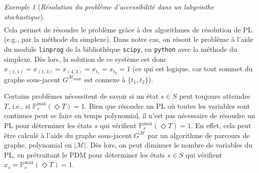 \documentclass[12pt,a4paper]{report}
\theoremstyle{definition}%
\theoremstyle{remark}
\newtheorem{example}{Exemple}[chapter]
\newcommand{\pr}{\mathbb{P}}
\begin{document}
\begin{example}[\textit{Résolution du problème d'accessibilité dans un labyrinthe stochastique}]
\begin{gather*}
\end{gather*}
Cela permet de résoudre le problème grâce à des algorithmes de résolution de
PL (e.g., par la méthode du simplexe).
Dans notre cas, on résout le problème à l'aide du module \verb|linprog|
de la bibliothèque \verb|scipy|, en \verb|python| avec la méthode du simplexe.
Dès lors, la solution de ce
système est donc $x_{(1, 1)} = x_{(1, 3)} = x_{(4, 3)} = x_{t_1} = x_{t_2} = 1$
(ce qui est logique, car tout sommet du graphe sous-jacent $G^{\mathcal{M}_{\text{maze}}}$
est connexe à $\{t_1, t_2 \}$).
\\
\end{example}

Certains problèmes nécessitent de savoir si un état $s \in S$ peut toujours
atteindre $T$, i.e., si $\pr^{\max}_s(\Diamond T) = 1$.
Bien que résoudre un PL où toutes les variables sont continues peut se faire
en temps polynomial, il n'est pas nécessaire de résoudre un PL pour déterminer
les états $s$ qui vérifient $\pr^{\max}_s(\Diamond T) = 1$.
En effet, cela peut être calculé à l'aide du graphe sous-jacent
$G^\mathcal{M}$ par un algorithme de parcours de graphe, polynomial en
$|\mathcal{M}|$. Dès lors, on peut diminuer le nombre de variables du PL, en
prétraitant le PDM pour déterminer les états $s \in S$ qui vérifient
$x_s = \pr^{\max}_s(\Diamond T) = 1$.
\end{document}
